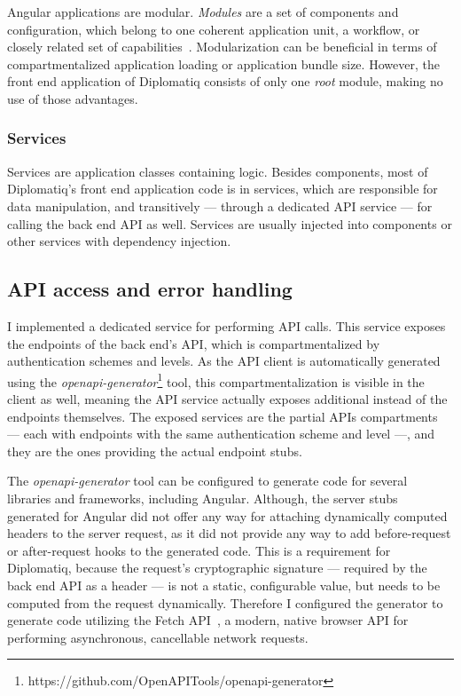 Angular applications are modular. \emph{Modules} are a set of components and configuration, which belong to one coherent application unit, a workflow, or closely related set of capabilities~\cite{angular-reference-docs}. Modularization can be beneficial in terms of compartmentalized application loading or application bundle size. However, the front end application of Diplomatiq consists of only one \emph{root} module, making no use of those advantages.

\subsubsection{Services}

Services are application classes containing logic. Besides components, most of Diplomatiq's front end application code is in services, which are responsible for data manipulation, and transitively — through a dedicated API service — for calling the back end API as well. Services are usually injected into components or other services with dependency injection.

\subsection{API access and error handling}

I implemented a dedicated service for performing API calls. This service exposes the endpoints of the back end's API, which is compartmentalized by authentication schemes and levels. As the API client is automatically generated using the \emph{openapi-generator}\footnote{https://github.com/OpenAPITools/openapi-generator} tool, this compartmentalization is visible in the client as well, meaning the API service actually exposes additional  instead of the endpoints themselves. The exposed services are the partial APIs compartments — each with endpoints with the same authentication scheme and level —, and they are the ones providing the actual endpoint stubs.

The \emph{openapi-generator} tool can be configured to generate code for several libraries and frameworks, including Angular. Although, the server stubs generated for Angular did not offer any way for attaching dynamically computed headers to the server request, as it did not provide any way to add before-request or after-request hooks to the generated code. This is a requirement for Diplomatiq, because the request's cryptographic signature — required by the back end API as a header — is not a static, configurable value, but needs to be computed from the request dynamically. Therefore I configured the generator to generate code utilizing the Fetch API~\cite{fetchapi}, a modern, native browser API for performing asynchronous, cancellable network requests.


